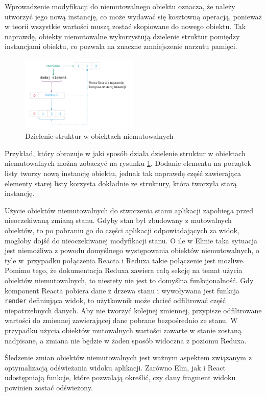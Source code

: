 Wprowadzenie modyfikacji do niemutowalnego obiektu oznacza, że należy utworzyć jego nową instancję, co może wydawać się kosztowną operacją, ponieważ w teorii wszystkie wartości muszą zostać skopiowane do nowego obiektu. Tak naprawdę, obiekty niemutowalne wykorzystują dzielenie struktur pomiędzy instancjami obiektu, co pozwala na znaczne zmniejszenie narzutu pamięci.
\begin{figure}[h]
	\centering
	\includegraphics[width=0.5\textwidth]{images/structure_sharing}
	\caption{Dzielenie struktur w obiektach niemutowalnych}
	\label{fig:structSharing}
\end{figure}
Przykład, który obrazuje w jaki sposób działa dzielenie struktur w obiektach niemutowalnych można zobaczyć na rysunku \ref{fig:structSharing}. Dodanie elementu na początek listy tworzy nową instancję obiektu, jednak tak naprawdę część zawierająca elementy starej listy korzysta dokładnie ze struktury, która tworzyła starą instancję.

Użycie obiektów niemutowalnych do stworzenia stanu aplikacji zapobiega przed nieoczekiwaną zmianą stanu. Gdyby stan był zbudowany z mutowalnych obiektów, to po pobraniu go do części aplikacji odpowiadających za widok, mogłoby dojść do nieoczekiwanej modyfikacji stanu. O ile w Elmie taka sytuacja jest niemożliwa z powodu domyślnego występowania obiektów niemutowalnych, o tyle w~przypadku połączenia Reacta i Reduxa takie połączenie jest możliwe. Pomimo tego, że dokumentacja Reduxa zawiera całą sekcję na temat użycia obiektów niemutowalnych, to niestety nie jest to domyślna funkcjonalność. Gdy komponent Reacta pobiera dane z drzewa stanu i wywoływana jest funkcja \lstinline{render} definiująca widok, to użytkownik może chcieć odfiltrować część niepotrzebnych danych. Aby nie tworzyć kolejnej zmiennej, przypisze odfiltrowane wartości do zmiennej zawierającej dane pobrane bezpośrednio ze stanu. W przypadku użycia obiektów mutowalnych wartości zawarte w stanie zostaną nadpisane, a zmiana nie będzie w żaden sposób widoczna z poziomu Reduxa.

Śledzenie zmian obiektów niemutowalnych jest ważnym aspektem związanym z optymalizacją odświeżania widoku aplikacji. Zarówno Elm, jak i React udostępniają funkcje, które pozwalają określić, czy dany fragment widoku powinien zostać odświeżony. 

